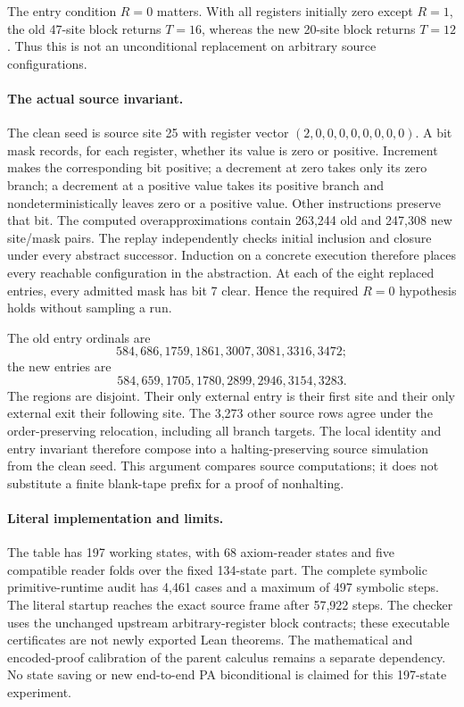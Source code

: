 The entry condition $R=0$ matters. With all registers initially zero except
$R=1$, the old 47-site block returns $T=16$, whereas the new 20-site block
returns $T=12$. Thus this is not an unconditional replacement on arbitrary
source configurations.

\paragraph{The actual source invariant.}
The clean seed is source site 25 with register vector
$(2,0,0,0,0,0,0,0,0)$. A bit mask records, for each register, whether its
value is zero or positive. Increment makes the corresponding bit positive;
a decrement at zero takes only its zero branch; a decrement at a positive
value takes its positive branch and nondeterministically leaves zero or a
positive value. Other instructions preserve that bit.
The computed overapproximations contain 263,244 old and 247,308 new
site/mask pairs. The replay independently checks initial inclusion and
closure under every abstract successor. Induction on a concrete execution
therefore places every reachable configuration in the abstraction. At each
of the eight replaced entries, every admitted mask has bit 7 clear.
Hence the required $R=0$ hypothesis holds without sampling a run.

The old entry ordinals are
\[
584,686,1759,1861,3007,3081,3316,3472;
\]
the new entries are
\[
584,659,1705,1780,2899,2946,3154,3283.
\]
The regions are disjoint. Their only external entry is their first site and
their only external exit their following site. The 3,273 other source rows
agree under the order-preserving relocation, including all branch targets.
The local identity and entry invariant therefore compose into a
halting-preserving source simulation from the clean seed. This argument
compares source computations; it does not substitute a finite blank-tape
prefix for a proof of nonhalting.

\paragraph{Literal implementation and limits.}
The table has 197 working states, with 68 axiom-reader states and five
compatible reader folds over the fixed 134-state part. The complete symbolic
primitive-runtime audit has 4,461 cases and a maximum of 497 symbolic steps.
The literal startup reaches the exact source frame after 57,922 steps.
The checker uses the unchanged upstream arbitrary-register block contracts;
these executable certificates are not newly exported Lean theorems. The
mathematical and encoded-proof calibration of the parent calculus remains a
separate dependency. No state saving or new end-to-end PA biconditional is
claimed for this 197-state experiment.
